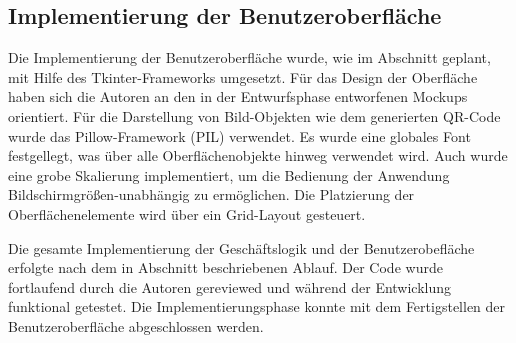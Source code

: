 \subsection{Implementierung der Benutzeroberfläche}
\label{sec:ImplementierungBenutzeroberflaeche}
Die Implementierung der Benutzeroberfläche wurde, wie im Abschnitt  geplant, mit Hilfe des Tkinter-Frameworks umgesetzt. Für das Design der Oberfläche
haben sich die Autoren an den in der Entwurfsphase entworfenen Mockups orientiert. Für die Darstellung von Bild-Objekten wie dem generierten \acs{QR}-Code wurde das Pillow-Framework
(\acs{PIL}) verwendet. Es wurde eine globales Font festgellegt, was über alle Oberflächenobjekte hinweg verwendet wird. Auch wurde eine grobe Skalierung implementiert, um die 
Bedienung der Anwendung Bildschirmgrößen-unabhängig zu ermöglichen. Die Platzierung der Oberflächenelemente wird über ein Grid-Layout gesteuert.

Die gesamte Implementierung der Geschäftslogik und der Benutzerobefläche erfolgte nach dem in Abschnitt  beschriebenen Ablauf. Der Code wurde
fortlaufend durch die Autoren gereviewed und während der Entwicklung funktional getestet. Die Implementierungsphase konnte mit dem Fertigstellen der Benutzeroberfläche
abgeschlossen werden. 